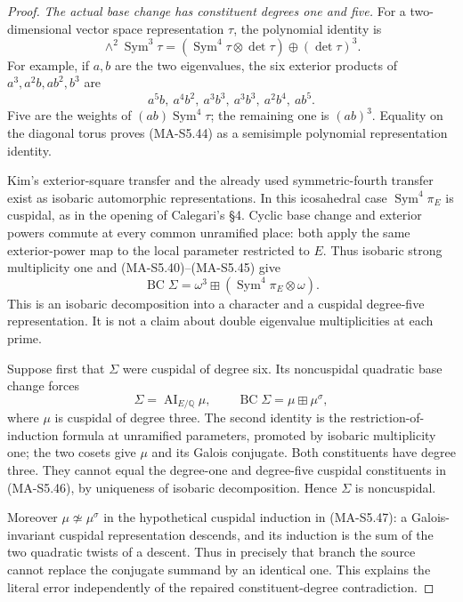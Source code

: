 \begin{proof}
\emph{The actual base change has constituent degrees one and five.}
For a two-dimensional vector space representation $\tau$,
the polynomial identity is
\[
 \wedge^2\operatorname{Sym}^3\tau
   =(\operatorname{Sym}^4\tau\otimes\det\tau)
                                      \oplus(\det\tau)^3.
 \tag{MA-S5.44}
\]
For example, if $a,b$ are the two eigenvalues, the six
exterior products of $a^3,a^2b,ab^2,b^3$ are
\[
                 a^5b,\ a^4b^2,\ a^3b^3,\ a^3b^3,
                                  \ a^2b^4,\ ab^5.
 \tag{MA-S5.45}
\]
Five are the weights of $(ab)\operatorname{Sym}^4\tau$;
the remaining one is $(ab)^3$.  Equality on the diagonal
torus proves (MA-S5.44) as a semisimple polynomial
representation identity.

Kim's exterior-square transfer and the already used
symmetric-fourth transfer exist as isobaric automorphic
representations.  In this icosahedral case
$\operatorname{Sym}^4\pi_E$ is cuspidal, as in the opening
of Calegari's \S4.  Cyclic base change and exterior powers
commute at every common unramified place: both apply the
same exterior-power map to the local parameter restricted
to $E$.  Thus isobaric strong multiplicity one and
(MA-S5.40)--(MA-S5.45) give
\[
 \operatorname{BC}\Sigma
    =\omega^3\boxplus
                       (\operatorname{Sym}^4\pi_E\otimes\omega).
 \tag{MA-S5.46}
\]
This is an isobaric decomposition into a character and a
cuspidal degree-five representation.  It is not a claim
about double eigenvalue multiplicities at each prime.

Suppose first that $\Sigma$ were cuspidal of degree six.
Its noncuspidal quadratic base change forces
\[
 \Sigma=\operatorname{AI}_{E/\mathbb Q}\mu,
 \qquad
 \operatorname{BC}\Sigma=\mu\boxplus\mu^\sigma,
 \tag{MA-S5.47}
\]
where $\mu$ is cuspidal of degree three.  The second
identity is the restriction-of-induction formula at
unramified parameters, promoted by isobaric multiplicity
one; the two cosets give $\mu$ and its Galois conjugate.
Both constituents have degree three.  They cannot equal
the degree-one and degree-five cuspidal constituents in
(MA-S5.46), by uniqueness of isobaric decomposition.
Hence $\Sigma$ is noncuspidal.

Moreover $\mu\not\simeq\mu^\sigma$ in the hypothetical
cuspidal induction in (MA-S5.47): a Galois-invariant
cuspidal representation descends, and its induction is
the sum of the two quadratic twists of a descent.
Thus in precisely that branch the source cannot replace
the conjugate summand by an identical one.  This explains
the literal error independently of the repaired
constituent-degree contradiction.


\end{proof}
